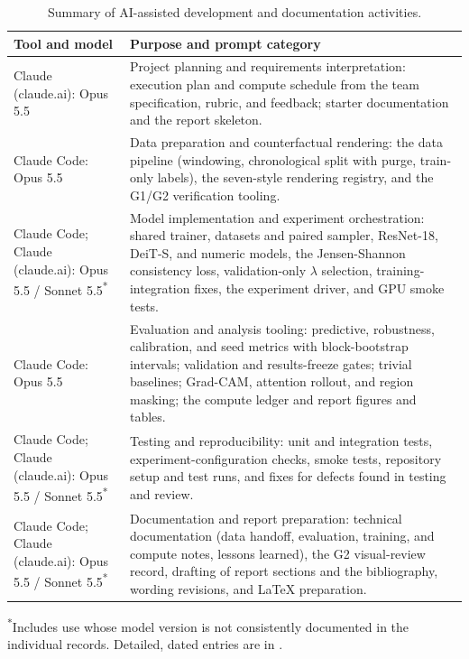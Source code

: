 \documentclass[10pt,journal,compsoc]{IEEEtran}
\begin{document}
\begin{table}[!t]
\centering
\caption{Summary of AI-assisted development and documentation activities.}
\label{tab:genai}
\small
\begin{tabularx}{\textwidth}{@{}>{\raggedright\arraybackslash}p{4.4cm}Y@{}}
\toprule
\textbf{Tool and model} & \textbf{Purpose and prompt category} \\
\midrule
Claude (claude.ai): Opus 5.5 & Project planning and requirements interpretation: execution plan and compute schedule from the team specification, rubric, and feedback; starter documentation and the report skeleton. \\
Claude Code: Opus 5.5 & Data preparation and counterfactual rendering: the data pipeline (windowing, chronological split with purge, train-only labels), the seven-style rendering registry, and the G1/G2 verification tooling. \\
Claude Code; Claude (claude.ai): Opus 5.5 / Sonnet 5.5\textsuperscript{*} & Model implementation and experiment orchestration: shared trainer, datasets and paired sampler, ResNet-18, DeiT-S, and numeric models, the Jensen-Shannon consistency loss, validation-only $\lambda$ selection, training-integration fixes, the experiment driver, and GPU smoke tests. \\
Claude Code: Opus 5.5 & Evaluation and analysis tooling: predictive, robustness, calibration, and seed metrics with block-bootstrap intervals; validation and results-freeze gates; trivial baselines; Grad-CAM, attention rollout, and region masking; the compute ledger and report figures and tables. \\
Claude Code; Claude (claude.ai): Opus 5.5 / Sonnet 5.5\textsuperscript{*} & Testing and reproducibility: unit and integration tests, experiment-configuration checks, smoke tests, repository setup and test runs, and fixes for defects found in testing and review. \\
Claude Code; Claude (claude.ai): Opus 5.5 / Sonnet 5.5\textsuperscript{*} & Documentation and report preparation: technical documentation (data handoff, evaluation, training, and compute notes, lessons learned), the G2 visual-review record, drafting of report sections and the bibliography, wording revisions, and LaTeX preparation. \\
\bottomrule
\end{tabularx}
\par\smallskip\parbox{\textwidth}{\footnotesize \textsuperscript{*}Includes use whose model version is not consistently documented in the individual records. Detailed, dated entries are in .}
\end{table}
\end{document}
